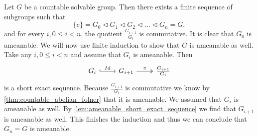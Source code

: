 Let $G$ be a countable solvable group. Then there exists a finite sequence of subgroups such that 
$$\{e\} = G_0 \triangleleft G_1 \triangleleft G_2 \triangleleft \dots \triangleleft G_n = G,$$ and for every $i, 0\le i<n$, the quotient $\frac{G_{i+1}}{G_i}$ is commutative. 
It is clear that $G_0$ is ameanable. We will now use finite induction to show that $G$ is ameanable as well. 
Take any $i, 0\le i<n$ and assume that $G_i$ is ameanable. Then 
\[\begin{tikzcd}
    G_i \arrow[r, "Id", hook] & G_{i+1} \arrow[r, "\pi", two heads] & \frac{G_{i+1}}{G_i}
    \end{tikzcd}\]
is a short exact sequence. Because $\frac{G_{i+1}}{G_i}$ is commutative we know by \cref{thm:countable_abelian_folner} that it is ameanable. We assumed that $G_i$ is ameanable as well. By \cref{lem:ameanable_short_exact_sequence} we find that $G_{i+1}$ is ameanable as well. This finishes the induction and thus we can conclude that $G_n = G$ is ameanable.

